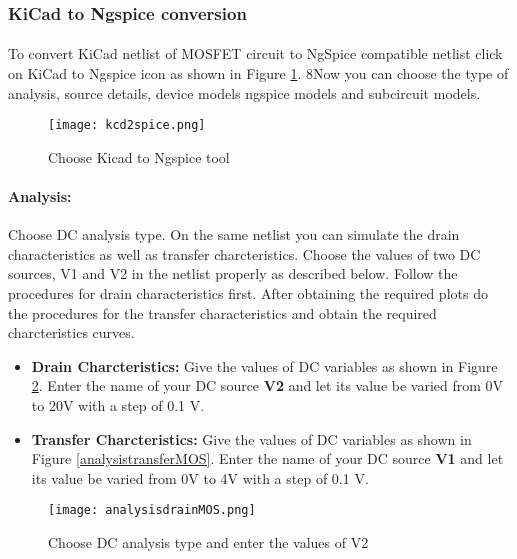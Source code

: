 \subsubsection{KiCad to Ngspice conversion}

\paragraph{} To convert KiCad netlist of MOSFET circuit to NgSpice
compatible netlist click on KiCad to Ngspice icon as shown in Figure \ref{kcd2spice8}. 8Now you can choose the type of analysis, source details, device models ngspice models and subcircuit models.


\begin{figure}[h]
\centering
\texttt{[image: kcd2spice.png]}
\caption{Choose Kicad to Ngspice tool}
\label{kcd2spice8}
\end{figure}


\paragraph{Analysis:}Choose DC analysis type. On the same netlist you can simulate the drain characteristics as well as transfer charcteristics. Choose the values of two DC sources, V1 and V2 in the netlist properly as described below. Follow the procedures for drain characteristics first. After obtaining the required plots do the procedures for the transfer characteristics and obtain the required charcteristics curves.

\begin{itemize}
\item 
\textbf{Drain Charcteristics:} Give the values of DC variables as shown in Figure \ref{analysisdrainMOS}. Enter the name of your DC source \textbf{V2} and let its value be varied from 0V to 20V with a step of 0.1 V.


\item
 \textbf{Transfer Charcteristics:} Give the values of DC variables as shown in Figure \ref{analysistransferMOS}. Enter the name of your DC source \textbf{V1} and let its value be varied from 0V to 4V with a step of 0.1 V.


\end{itemize}

\begin{figure}[h]
\centering
\texttt{[image: analysisdrainMOS.png]}
\caption{Choose DC analysis type and enter the values of V2}
\label{analysisdrainMOS}
\end{figure}

